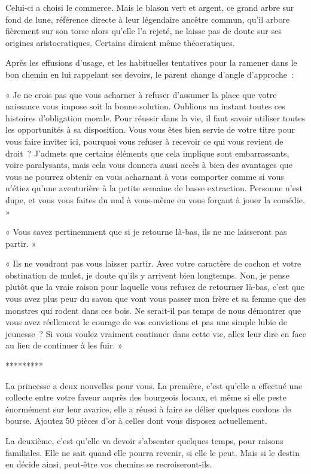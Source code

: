 \documentclass{report}
\newcommand{\ellipse}{
    \begin{center}
        *********
    \end{center}
}
\begin{document}
Celui-ci a choisi le commerce. Mais le blason vert et argent, ce grand arbre sur fond de lune, référence directe à leur légendaire ancêtre commun, qu'il arbore fièrement sur son torse alors qu'elle l'a rejeté, ne laisse pas de doute sur ses origines aristocratiques. Certains diraient même théocratiques.

Après les effusions d'usage, et les habituelles tentatives pour la ramener dans le bon chemin en lui rappelant ses devoirs, le parent change d'angle d'approche :

« Je ne crois pas que vous acharner à refuser d'assumer la place que votre naissance vous impose soit la bonne solution. Oublions un instant toutes ces histoires d'obligation morale. Pour réussir dans la vie, il faut savoir utiliser toutes les opportunités à sa disposition. Vous vous êtes bien servie de votre titre pour vous faire inviter ici, pourquoi vous refuser à recevoir ce qui vous revient de droit ? J'admets que certains éléments que cela implique sont embarrassants, voire paralysants, mais cela vous donnera aussi accès à bien des avantages que vous ne pourrez obtenir en vous acharnant à vous comporter comme si vous n'étiez qu'une aventurière à la petite semaine de basse extraction. Personne n'est dupe, et vous vous faites du mal à vous-même en vous forçant à jouer la comédie. »

« Vous savez pertinemment que si je retourne là-bas, ils ne me laisseront pas partir. »

« Ils ne voudront pas vous laisser partir. Avec votre caractère de cochon et votre obstination de mulet, je doute qu'ils y arrivent bien longtemps. Non, je pense plutôt que la vraie raison pour laquelle vous refusez de retourner là-bas, c'est que vous avez plus peur du savon que vont vous passer mon frère et sa femme que des monstres qui rodent dans ces bois. Ne serait-il pas temps de nous démontrer que vous avez réellement le courage de vos convictions et pas une simple lubie de jeunesse ? Si vous voulez vraiment continuer dans cette vie, allez leur dire en face au lieu de continuer à les fuir. »

\ellipse

La princesse a deux nouvelles pour vous. La première, c'est qu'elle a effectué une collecte entre votre faveur auprès des bourgeois locaux, et même si elle peste énormément sur leur avarice, elle a réussi à faire se délier quelques cordons de bourse. Ajoutez 50 pièces d'or à celles dont vous disposez actuellement.

La deuxième, c'est qu'elle va devoir s'absenter quelques temps, pour raisons familiales. Elle ne sait quand elle pourra revenir, si elle le peut. Mais si le destin en décide ainsi, peut-être vos chemins se recroiseront-ils.
\end{document}
